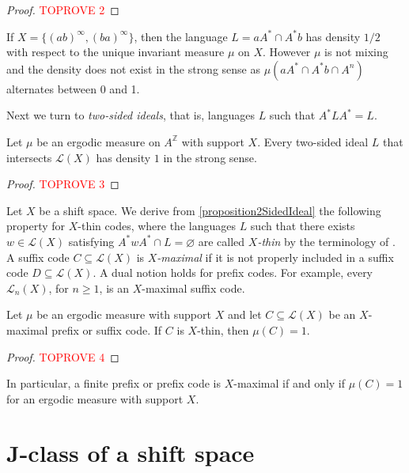 \documentclass[a4paper,UKenglish,numberwithinsect,cleveref]{lipics-v2021}
\newcommand{\Z}{\mathbb{Z}}
\newcommand{\cL}{\mathcal L}
\begin{document}
\begin{proof}\textcolor{red}{TOPROVE 2}\end{proof}

\begin{example}\label{ex:not-mixing}
    If $X=\{(ab)^\infty, (ba)^\infty\}$, then the language $L=aA^*\cap A^*b$ has density $1/2$ with respect to the unique invariant measure $\mu$ on $X$. However $\mu$ is not mixing and the density does not exist in the strong sense as $\mu(aA^*\cap A^*b\cap A^n)$ alternates between 0 and 1.
\end{example}

Next we turn to \emph{two-sided ideals}, that is, languages $L$ such that $A^*LA^*=L$. 

\begin{proposition}\label{proposition2SidedIdeal}
    Let $\mu$ be an ergodic measure on $A^\Z$ with support $X$. Every two-sided ideal  $L$ that intersects $\cL(X)$ has density $1$ in the strong sense.
\end{proposition}

\begin{proof}\textcolor{red}{TOPROVE 3}\end{proof}

Let $X$ be a shift space. We derive from \cref{proposition2SidedIdeal} the following property for $X$-thin codes, where  the languages $L$ such that there exists $w\in \cL(X)$  satisfying $ A^*wA^*\cap L=\varnothing$ are called \emph{$X$-thin} by the  terminology of \cite{BerstelDeFelicePerrinReutenauerRindone2012}.  A suffix code $C\subseteq \cL(X)$ is \emph{$X$-maximal} if it is not properly included in a suffix code $D\subseteq \cL(X)$. A dual notion holds for prefix codes. For example, every $\cL_n(X)$, for $n\ge 1$, is an $X$-maximal suffix code.
\begin{proposition}\label{propositionThinSuff}
    Let $\mu$ be an ergodic measure with support $X$ and let $C\subseteq\cL(X)$ be an $X$-maximal prefix or suffix code. If $C$ is $X$-thin, then $\mu(C)=1$.  
\end{proposition}

\begin{proof}\textcolor{red}{TOPROVE 4}\end{proof}
In particular, a finite prefix or prefix code is $X$-maximal if and only if $\mu(C)=1$ for an ergodic measure with support $X$. 

\section{J-class of a shift space}
\label{sec:Jclass}
\end{document}
